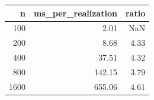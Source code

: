\begin{tabular}{rrr}
\toprule
n & ms_per_realization & ratio \\
\midrule
100 & 2.01 & NaN \\
200 & 8.68 & 4.33 \\
400 & 37.51 & 4.32 \\
800 & 142.15 & 3.79 \\
1600 & 655.06 & 4.61 \\
\bottomrule
\end{tabular}
